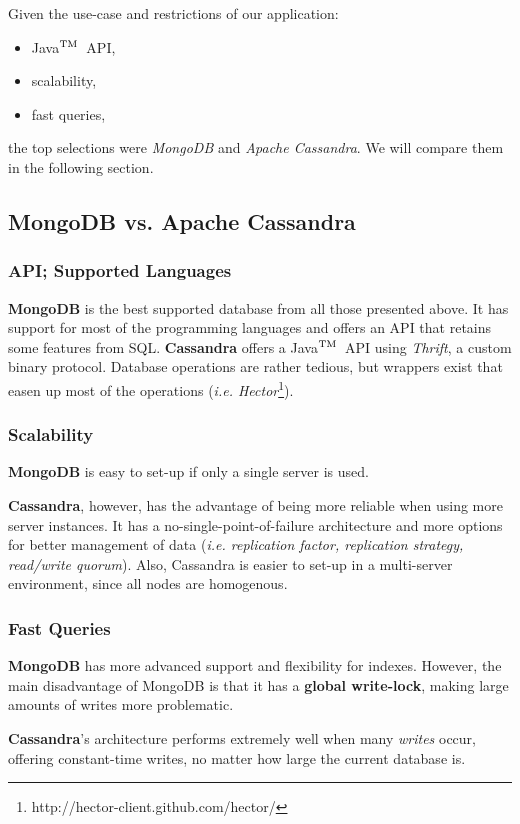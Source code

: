 \documentclass[a4paper,onecolumn,oneside,titlepage,11pt]{report}
\def\tm{\leavevmode\hbox{$\rm {}^{TM}$}}
\begin{document}
	Given the use-case and restrictions of our application:
	\begin{itemize}
		\item Java\tm\ API,
		\item scalability,
		\item fast queries,
	\end{itemize}
	the top selections were \emph{MongoDB} and \emph{Apache Cassandra}. We will compare them in the following section.
	\subsection{MongoDB vs. Apache Cassandra}
	\subsubsection*{API; Supported Languages}
	\textbf{MongoDB} is the best supported database from all those presented above. It has support for most of the programming languages and offers an API that retains some features from SQL.
	\noindent\textbf{Cassandra} offers a Java\tm\ API using \emph{Thrift}, a custom binary protocol. Database operations are rather tedious, but wrappers exist that easen up most of the operations (\emph{i.e. Hector}\footnote{http://hector-client.github.com/hector/}).
	\subsubsection*{Scalability}
	\textbf{MongoDB} is easy to set-up if only a single server is used.
	
	\noindent\textbf{Cassandra}, however, has the advantage of being more reliable when using more server instances. It has a no-single-point-of-failure architecture and more options for better management of data (\emph{i.e. replication factor, replication strategy, read/write quorum}). Also, Cassandra is easier to set-up in a multi-server environment, since all nodes are homogenous.
	\subsubsection*{Fast Queries}
	
	\indent\textbf{MongoDB} has more advanced support and flexibility for indexes. However, the main disadvantage of MongoDB is that it has a \textbf{global write-lock}, making large amounts of writes more problematic.
	
	\noindent\textbf{Cassandra}'s architecture performs extremely well when many \emph{writes} occur, offering constant-time writes, no matter how large the current database is.
	
\end{document}
